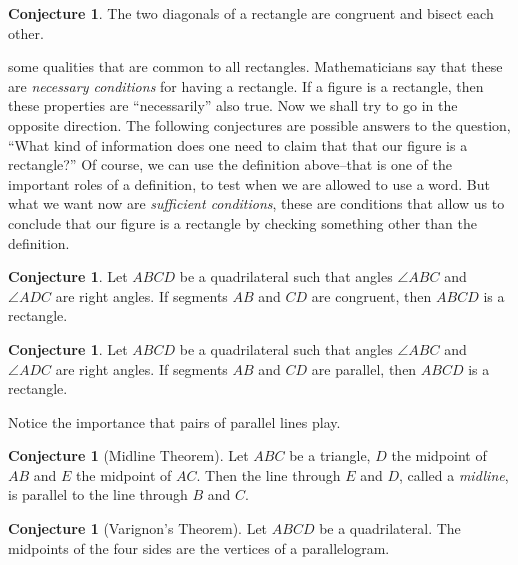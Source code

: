 \documentclass{tufte-handout}
\theoremstyle{definition}
\newtheorem{conjecture}[problem]{Conjecture}
\begin{document}
\begin{conjecture}\label{conj:rectangle-diagonals}
The two diagonals of a rectangle are congruent and bisect each other.
\end{conjecture}

\begin{fullwidth}
 some qualities that are common to all rectangles. Mathematicians say that these are \emph{necessary conditions} for having a rectangle.
If a figure is a rectangle, then these properties are ``necessarily'' also true. Now we shall try to go in the opposite direction.
The following conjectures are possible answers to the question, ``What kind of information does one need to claim that that our figure is a rectangle?''
Of course, we can use the definition above--that is one of the important roles of a definition, to test when we are allowed to use a word.
But what we want now are \emph{sufficient conditions}, these are conditions that allow us to conclude that our figure is a rectangle by checking something other than the definition.
\end{fullwidth}

\begin{conjecture}\label{conj:opp-congruent-implies-rectangle}
Let $ABCD$ be a quadrilateral such that angles $\angle ABC$ and $\angle ADC$ are right angles.
If segments $AB$ and $CD$ are congruent, then $ABCD$ is a rectangle.
\end{conjecture}

\begin{conjecture}\label{conj:opp-parallel-implies-rectangle}
Let $ABCD$ be a quadrilateral such that angles $\angle ABC$ and $\angle ADC$ are right angles.
If segments $AB$ and $CD$ are parallel, then $ABCD$ is a rectangle.
\end{conjecture}

Notice the importance that pairs of parallel lines play.

\begin{conjecture}[Midline Theorem] \label{conj:midline-theorem}
Let $ABC$ be a triangle, $D$ the midpoint of $AB$ and $E$ the midpoint of $AC$.
Then the line through $E$ and $D$, called a \emph{midline}, is parallel to the line through $B$ and $C$.
\end{conjecture}

\begin{conjecture}[Varignon's Theorem]\label{conj:Varignon}
Let $ABCD$ be a quadrilateral. The midpoints of the four sides are the vertices of a parallelogram.
\end{conjecture}


\vfill
\end{document}
